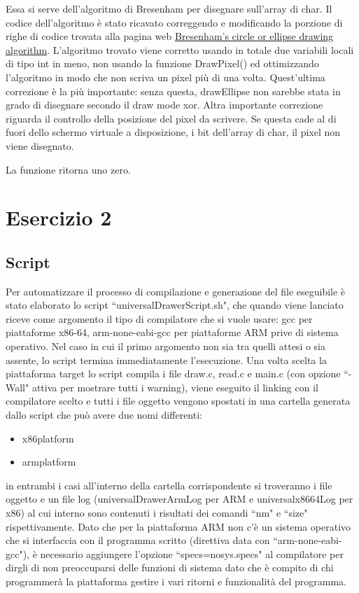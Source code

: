 \documentclass{article}
\begin{document}
		Essa si serve dell'algoritmo di Bresenham per disegnare sull'array di char.
                Il codice dell'algoritmo è stato ricavato correggendo e modificando la porzione di righe di codice trovata alla pagina web
                \href{https://sites.google.com/site/ruslancray/lab/projects/bresenhamscircleellipsedrawingalgorithm/bresenham-s-circle-ellipse-drawing-algorithm}{Bresenham's circle or ellipse drawing algorithm}.
                L'algoritmo trovato viene corretto usando in totale due variabili locali di tipo int in meno, non usando la funzione DrawPixel()
                ed ottimizzando l'algoritmo in modo che non scriva un pixel più di una volta. Quest'ultima correzione è la più importante:
                senza questa, drawEllipse non sarebbe stata in grado di disegnare secondo il draw mode xor.
                Altra importante correzione riguarda il controllo della posizione del pixel da scrivere.
                Se questa cade al di fuori dello schermo virtuale a disposizione, i bit dell'array di char, il pixel non viene disegnato.
		
		La funzione ritorna uno zero.

\section{Esercizio 2}
	\subsection{Script}
	Per automatizzare il processo di compilazione e generazione del file eseguibile è stato elaborato lo script ``universalDrawerScript.sh", che quando viene lanciato riceve come argomento il tipo di compilatore che si vuole usare: gcc per piattaforme x86-64, arm-none-eabi-gcc per piattaforme ARM prive di sistema operativo. Nel caso in cui il primo argomento non sia tra quelli attesi o sia assente, lo script termina immediatamente l'esecuzione.
	\newline
	Una volta scelta la piattaforma target lo script compila i file draw.c, read.c e main.c (con opzione ``-Wall" attiva per mostrare tutti i warning), viene eseguito il linking con il compilatore scelto e tutti i file oggetto vengono spostati in una cartella generata dallo script che può avere due nomi differenti:
	\begin{itemize}
		\item x86\textunderscore platform 
		\item arm\textunderscore platform 
	\end{itemize}
in entrambi i casi all'interno della cartella corrispondente si troveranno i file oggetto e un file log (universalDrawerArmLog per ARM e universalx86\textunderscore 64Log per x86) al cui interno sono contenuti i risultati dei comandi ``nm" e ``size" rispettivamente.
\newline
Dato che per la piattaforma ARM non c'è un sistema operativo che si interfaccia con il programma scritto  (direttiva data con ``arm-none-eabi-gcc"), è necessario aggiungere l'opzione ``specs=nosys.specs" al compilatore per dirgli di non preoccuparsi delle funzioni di sistema dato che è compito di chi programmerà la piattaforma gestire i vari ritorni e funzionalità del programma.
\end{document}
